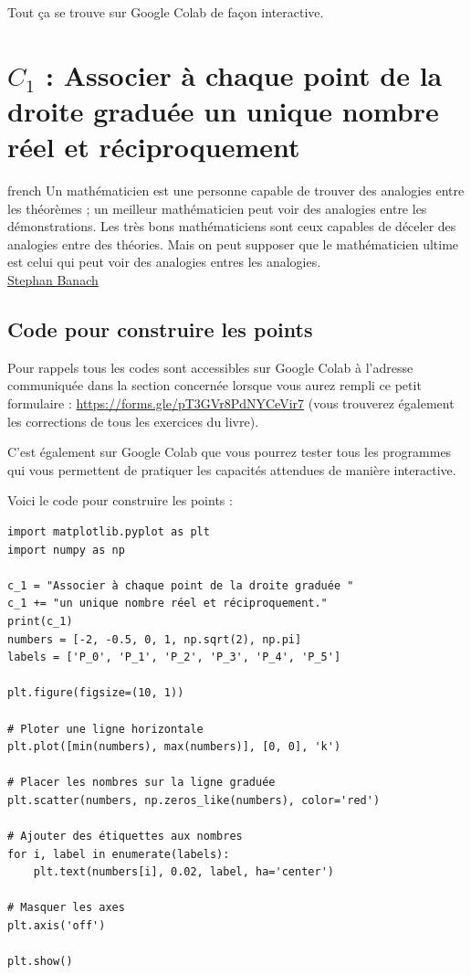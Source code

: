 \documentclass[a4paper, 11pt, twoside]{book}
\begin{document}
Tout ça se trouve sur Google Colab de façon interactive.
\stopcontents[level-2]

\chapter{\(C_1\) : Associer à chaque point de la droite graduée un unique nombre réel et réciproquement}
\label{sec:org2051646}
\startcontents[level-2]

\begin{foreigndisplayquote}{french}
Un mathématicien est une personne capable de trouver des analogies
entre les théorèmes ; un meilleur mathématicien peut voir des
analogies entre les démonstrations. Les très bons mathématiciens
sont ceux capables de déceler des analogies entre des
théories. Mais on peut supposer que le mathématicien ultime est
celui qui peut voir des analogies entres les analogies.\\

\href{https://fr.wikipedia.org/wiki/Stefan\_Banach}{Stephan Banach}
\end{foreigndisplayquote}

\section{Code pour construire les points}
\label{sec:org7d3dc01}

Pour rappels tous les codes sont accessibles sur Google Colab à
l'adresse communiquée dans la section concernée lorsque vous
aurez rempli ce petit formulaire :
\url{https://forms.gle/pT3GVr8PdNYCeVir7} (vous trouverez également
les corrections de tous les exercices du livre).

C'est également sur Google Colab que vous pourrez tester tous les
programmes qui vous permettent de pratiquer les capacités attendues
de manière interactive.

Voici le code pour construire les points :

\begin{verbatim}
import matplotlib.pyplot as plt
import numpy as np

c_1 = "Associer à chaque point de la droite graduée "
c_1 += "un unique nombre réel et réciproquement."
print(c_1)
numbers = [-2, -0.5, 0, 1, np.sqrt(2), np.pi]
labels = ['P_0', 'P_1', 'P_2', 'P_3', 'P_4', 'P_5']

plt.figure(figsize=(10, 1))

# Ploter une ligne horizontale
plt.plot([min(numbers), max(numbers)], [0, 0], 'k')

# Placer les nombres sur la ligne graduée
plt.scatter(numbers, np.zeros_like(numbers), color='red')

# Ajouter des étiquettes aux nombres
for i, label in enumerate(labels):
    plt.text(numbers[i], 0.02, label, ha='center')

# Masquer les axes
plt.axis('off')

plt.show()
\end{verbatim}
\end{document}
